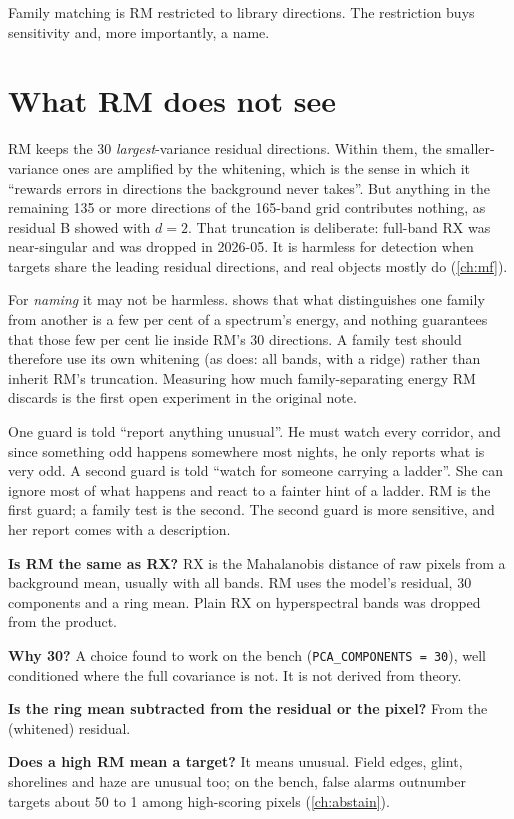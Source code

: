\documentclass[11pt,a4paper,oneside,openany]{book}
\begin{document}
Family matching is RM restricted to library directions. The restriction buys sensitivity and, more importantly, a name.

\section{What RM does not see}

RM keeps the 30 \emph{largest}-variance residual directions. Within them, the smaller-variance ones are amplified by the whitening,
which is the sense in which it ``rewards errors in directions the background never takes''. But anything in the remaining 135 or more
directions of the 165-band grid contributes nothing, as residual B showed with $d=2$. That truncation is deliberate: full-band RX was
near-singular and was dropped in 2026-05. It is harmless for detection when targets share the leading residual directions, and real
objects mostly do (\cref{ch:mf}).

For \emph{naming} it may not be harmless.  shows that what distinguishes one family from another is a few per cent
of a spectrum's energy, and nothing guarantees that those few per cent lie inside RM's 30 directions. A family test should therefore
use its own whitening (as  does: all bands, with a ridge) rather than inherit RM's truncation. Measuring how much
family-separating energy RM discards is the first open experiment in the original note.

\begin{analogy}
One guard is told ``report anything unusual''. He must watch every corridor, and since something odd happens somewhere most nights, he
only reports what is very odd. A second guard is told ``watch for someone carrying a ladder''. She can ignore most of what happens and
react to a fainter hint of a ladder. RM is the first guard; a family test is the second. The second guard is more sensitive, and her
report comes with a description.
\end{analogy}

\begin{confusions}
\textbf{Is RM the same as RX?} RX is the Mahalanobis distance of raw pixels from a background mean, usually with all bands. RM uses the
model's residual, 30 components and a ring mean. Plain RX on hyperspectral bands was dropped from the product.

\textbf{Why 30?} A choice found to work on the bench (\texttt{PCA\_COMPONENTS = 30}), well conditioned where the full covariance is not.
It is not derived from theory.

\textbf{Is the ring mean subtracted from the residual or the pixel?} From the (whitened) residual.

\textbf{Does a high RM mean a target?} It means unusual. Field edges, glint, shorelines and haze are unusual too; on the bench, false alarms
outnumber targets about 50 to 1 among high-scoring pixels (\cref{ch:abstain}).
\end{confusions}
\end{document}
